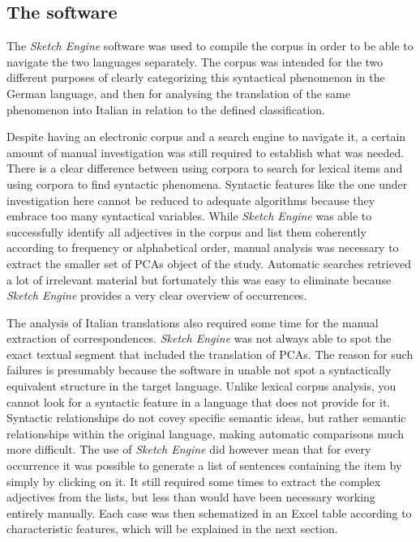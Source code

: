 \documentclass[output=paper,colorlinks,citecolor=brown]{langscibook}
\begin{document}
\subsection{The software}

The \textit{Sketch Engine} software was used to compile the corpus in order to be able to navigate the two languages separately. The corpus was intended for the two different purposes of clearly categorizing this syntactical phenomenon in the German language, and then for analysing the translation of the same phenomenon into Italian in relation to the defined classification.

Despite having an electronic corpus and a search engine to navigate it, a certain amount of manual investigation was still required to establish what was needed. There is a clear difference between using corpora to search for lexical items and using corpora to find syntactic phenomena. Syntactic features like the one under investigation here cannot be reduced to adequate algorithms because they embrace too many syntactical variables. While \textit{Sketch Engine} was able to successfully identify all adjectives in the corpus and list them coherently according to frequency or alphabetical order, manual analysis was necessary to extract the smaller set of PCAs object of the study. Automatic searches retrieved a lot of irrelevant material but fortunately this was easy to eliminate because \textit{Sketch Engine} provides a very clear overview of occurrences.

The analysis of Italian translations also required some time for the manual extraction of correspondences. \textit{Sketch Engine} was not always able to spot the exact textual segment that included the translation of PCAs. The reason for such failures is presumably because the software in unable not spot a syntactically equivalent structure in the target language. Unlike lexical corpus analysis, you cannot look for a syntactic feature in a language that does not provide for it. Syntactic relationships do not covey specific semantic ideas, but rather semantic relationships within the original language, making automatic comparisons much more difficult. The use of \textit{Sketch Engine} did however mean that for every occurrence it was possible to generate a list of sentences containing the item by simply by clicking on it. It still required some times to extract the complex adjectives from the lists, but less than would have been necessary working entirely manually. Each case was then schematized in an Excel table according to characteristic features, which will be explained in the next section.
\end{document}
